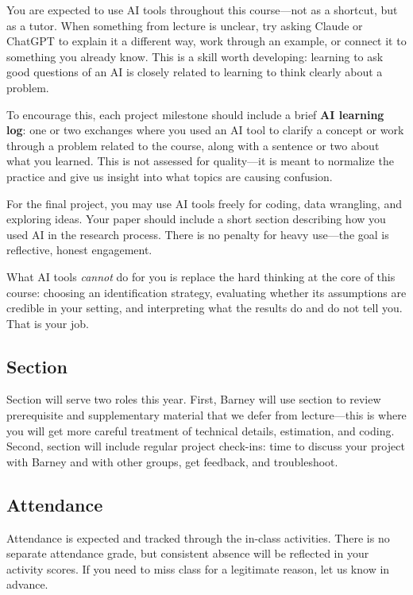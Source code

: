 \documentclass[PS]{syllabus}
\begin{document}
\begin{syllabus}
You are expected to use AI tools throughout this course---not as a shortcut, but as a tutor. When something from lecture is unclear, try asking Claude or ChatGPT to explain it a different way, work through an example, or connect it to something you already know. This is a skill worth developing: learning to ask good questions of an AI is closely related to learning to think clearly about a problem.

To encourage this, each project milestone should include a brief \textbf{AI learning log}: one or two exchanges where you used an AI tool to clarify a concept or work through a problem related to the course, along with a sentence or two about what you learned. This is not assessed for quality---it is meant to normalize the practice and give us insight into what topics are causing confusion.

For the final project, you may use AI tools freely for coding, data wrangling, and exploring ideas. Your paper should include a short section describing how you used AI in the research process. There is no penalty for heavy use---the goal is reflective, honest engagement.

What AI tools \emph{cannot} do for you is replace the hard thinking at the core of this course: choosing an identification strategy, evaluating whether its assumptions are credible in your setting, and interpreting what the results do and do not tell you. That is your job.

\subsection*{Section}

Section will serve two roles this year. First, Barney will use section to review prerequisite and supplementary material that we defer from lecture---this is where you will get more careful treatment of technical details, estimation, and coding. Second, section will include regular project check-ins: time to discuss your project with Barney and with other groups, get feedback, and troubleshoot.

\subsection*{Attendance}

Attendance is expected and tracked through the in-class activities. There is no separate attendance grade, but consistent absence will be reflected in your activity scores. If you need to miss class for a legitimate reason, let us know in advance.



\end{syllabus}
\end{document}
